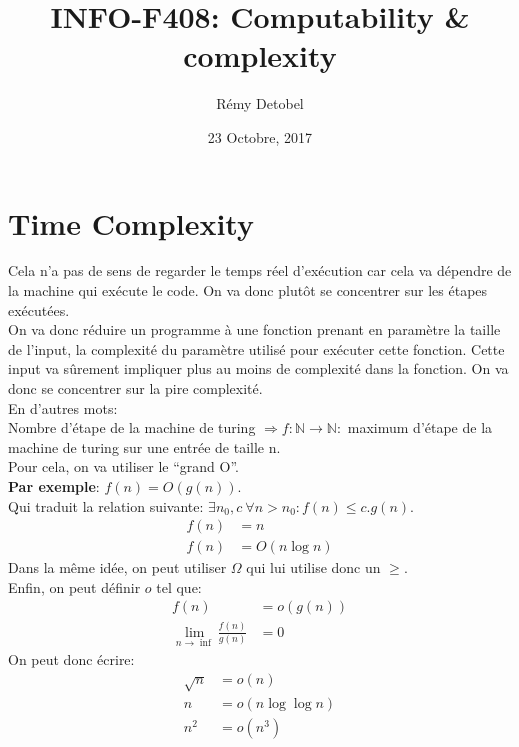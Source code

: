 \documentclass[a4paper,12pt]{article}
\title{INFO-F408: Computability \& complexity}
\date{23 Octobre, 2017}
\author{Rémy Detobel}
\begin{document}
\maketitle
\newpage

\section{Time Complexity}
  Cela n'a pas de sens de regarder le temps réel d'exécution car cela va dépendre de la machine qui exécute le code.  On va donc plutôt se concentrer sur les étapes exécutées.\\
  On va donc réduire un programme à une fonction prenant en paramètre la taille de l'input, la complexité du paramètre utilisé pour exécuter cette fonction.  Cette input va sûrement impliquer plus au moins de complexité dans la fonction.  On va donc se concentrer sur la pire complexité.\\
  En d'autres mots:\\
  Nombre d'étape de la machine de turing $\Rightarrow f: \mathbb{N} \rightarrow \mathbb{N} : $ maximum d'étape de la machine de turing sur une entrée de taille n.\\
  Pour cela, on va utiliser le ``grand O''.\\
  
  \textbf{Par exemple}: $f(n) = O(g(n))$.\\
  Qui traduit la relation suivante: $\exists n_0, c\ \forall n > n_0 : f(n) \leq c . g(n)$.\\
  \begin{align*}
    f(n) &= n\\
    f(n) &= O(n \log n)
  \end{align*}
  Dans la même idée, on peut utiliser $\Omega$ qui lui utilise donc un $\geq$.\\
  
  Enfin, on peut définir $o$ tel que:
  \begin{align*}
   f(n) &= o(g(n))\\
   \lim_{n \rightarrow \inf} \frac{f(n)}{g(n)} &= 0
  \end{align*}
  On peut donc écrire:
  \begin{align*}
   \sqrt{n} &= o(n)\\
   n &= o(n \log \log n)\\
   n^2 &= o(n^3)
  \end{align*}
  
\end{document}
